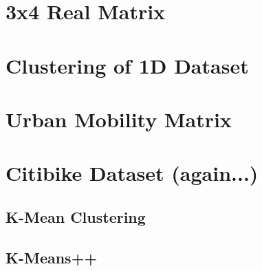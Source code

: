 \documentclass[12pt]{article}
\begin{document}
\maketitlepage

\section{3x4 Real Matrix}

\section{Clustering of 1D Dataset}

\section{Urban Mobility Matrix}

\section{Citibike Dataset (again...)}

\subsection{K-Mean Clustering}

\subsection{K-Means++}

\subsection{}
\end{document}
